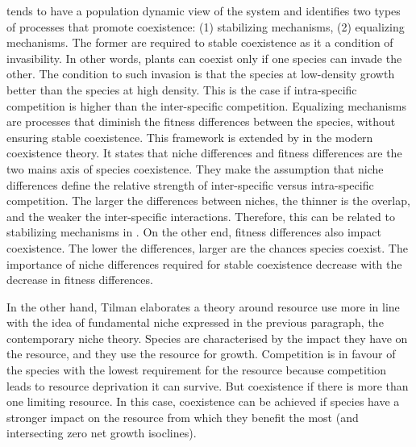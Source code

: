 \cite{chesson_mechanisms_2000} tends to have a population dynamic view of the system and identifies two types of processes that promote coexistence: (1) stabilizing mechanisms, (2) equalizing mechanisms. The former are required to stable coexistence as it a condition of invasibility. In other words, plants can coexist only if one species can invade the other. The condition to such invasion is that the species at low-density growth better than the species at high density. This is the case if intra-specific competition is higher than the inter-specific competition. Equalizing mechanisms are processes that diminish the fitness differences between the species, without ensuring stable coexistence. This framework is extended by \cite{adler_niche_2007} in the modern coexistence theory. It states that niche differences \parencite{levine_importance_2009} and fitness differences are the two mains axis of species coexistence. They make the assumption that niche differences define the relative strength of inter-specific versus intra-specific competition. The larger the differences between niches, the thinner is the overlap, and the weaker the inter-specific interactions. Therefore, this can be related to stabilizing mechanisms in \cite{chesson_general_2000}. On the other end, fitness differences also impact coexistence. The lower the differences, larger are the chances species coexist. The importance of niche differences required for stable coexistence decrease with the decrease in fitness differences.

In the other hand, Tilman elaborates a theory \cite{tilman_resource_1982, tilman_plant_1988} around resource use more in line with the idea of fundamental niche expressed in the previous paragraph, the contemporary niche theory. Species are characterised by the impact they have on the resource, and they use the resource for growth. Competition is in favour of the species with the lowest requirement for the resource because competition leads to resource deprivation it can survive. But coexistence if there is more than one limiting resource. In this case, coexistence can be achieved if species have a stronger impact on the resource from which they benefit the most (and intersecting zero net growth isoclines). 


